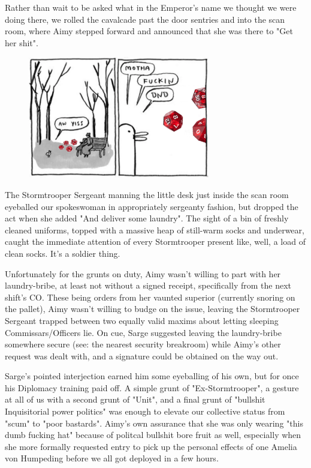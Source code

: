 Rather than wait to be asked what in the Emperor's name we thought we were doing there, we rolled the cavalcade past the door sentries and into the scan room, where Aimy stepped forward and announced that she was there to "Get her shit". 


\begin{figure}
	\begin{center}
		\includegraphics[width=\figwidth]{pics/21/68.png}
	\end{center}
\end{figure}
The Stormtrooper Sergeant manning the little desk just inside the scan room eyeballed our spokeswoman in appropriately sergeanty fashion, but dropped the act when she added "And deliver some laundry". 
The sight of a bin of freshly cleaned uniforms, topped with a massive heap of still-warm socks and underwear, caught the immediate attention of every Stormtrooper present like, well, a load of clean socks. 
It's a soldier thing.

Unfortunately for the grunts on duty, Aimy wasn't willing to part with her laundry-bribe, at least not without a signed receipt, specifically from the next shift's CO. 
These being orders from her vaunted superior (currently snoring on the pallet), Aimy wasn't willing to budge on the issue, leaving the Stormtrooper Sergeant trapped between two equally valid maxims about letting sleeping Commissars/Officers lie. 
On cue, Sarge suggested leaving the laundry-bribe somewhere secure (see: 
the nearest security breakroom) while Aimy's other request was dealt with, and a signature could be obtained on the way out. 


Sarge's pointed interjection earned him some eyeballing of his own, but for once his Diplomacy training paid off. 
A simple grunt of "Ex-Stormtrooper", a gesture at all of us with a second grunt of "Unit", and a final grunt of "bullshit Inquisitorial power politics" was enough to elevate our collective status from "scum" to "poor bastards". 
Aimy's own assurance that she was only wearing "this dumb fucking hat" because of politcal bullshit bore fruit as well, especially when she more formally requested entry to pick up the personal effects of one Amelia von Humpeding before we all got deployed in a few hours.

